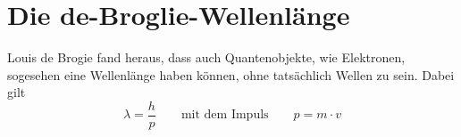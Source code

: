 \documentclass{article}
\begin{document}
\section{Die de-Broglie-Wellenlänge}
Louis de Brogie fand heraus, dass auch Quantenobjekte, wie Elektronen, sogesehen eine Wellenlänge haben können, ohne tatsächlich Wellen zu sein.
Dabei gilt
\[
 \lambda = \frac{h}{p} 
 \qquad
 \text{mit dem Impuls}
 \qquad
 p = m \cdot v 
\]
\end{document}
